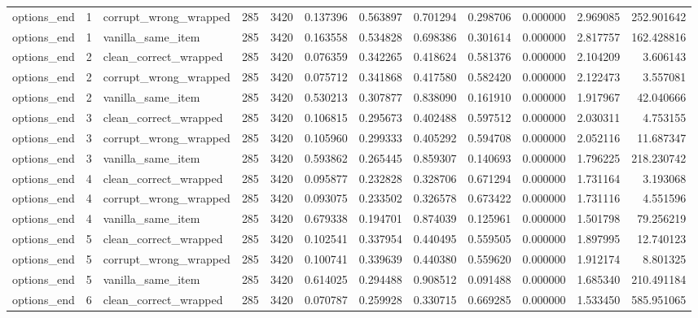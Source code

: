 \begin{tabular}{lrlrrrrrrrrr}
options\_end & 1 & corrupt\_wrong\_wrapped & 285 & 3420 & 0.137396 & 0.563897 & 0.701294 & 0.298706 & 0.000000 & 2.969085 & 252.901642 \\
options\_end & 1 & vanilla\_same\_item & 285 & 3420 & 0.163558 & 0.534828 & 0.698386 & 0.301614 & 0.000000 & 2.817757 & 162.428816 \\
options\_end & 2 & clean\_correct\_wrapped & 285 & 3420 & 0.076359 & 0.342265 & 0.418624 & 0.581376 & 0.000000 & 2.104209 & 3.606143 \\
options\_end & 2 & corrupt\_wrong\_wrapped & 285 & 3420 & 0.075712 & 0.341868 & 0.417580 & 0.582420 & 0.000000 & 2.122473 & 3.557081 \\
options\_end & 2 & vanilla\_same\_item & 285 & 3420 & 0.530213 & 0.307877 & 0.838090 & 0.161910 & 0.000000 & 1.917967 & 42.040666 \\
options\_end & 3 & clean\_correct\_wrapped & 285 & 3420 & 0.106815 & 0.295673 & 0.402488 & 0.597512 & 0.000000 & 2.030311 & 4.753155 \\
options\_end & 3 & corrupt\_wrong\_wrapped & 285 & 3420 & 0.105960 & 0.299333 & 0.405292 & 0.594708 & 0.000000 & 2.052116 & 11.687347 \\
options\_end & 3 & vanilla\_same\_item & 285 & 3420 & 0.593862 & 0.265445 & 0.859307 & 0.140693 & 0.000000 & 1.796225 & 218.230742 \\
options\_end & 4 & clean\_correct\_wrapped & 285 & 3420 & 0.095877 & 0.232828 & 0.328706 & 0.671294 & 0.000000 & 1.731164 & 3.193068 \\
options\_end & 4 & corrupt\_wrong\_wrapped & 285 & 3420 & 0.093075 & 0.233502 & 0.326578 & 0.673422 & 0.000000 & 1.731116 & 4.551596 \\
options\_end & 4 & vanilla\_same\_item & 285 & 3420 & 0.679338 & 0.194701 & 0.874039 & 0.125961 & 0.000000 & 1.501798 & 79.256219 \\
options\_end & 5 & clean\_correct\_wrapped & 285 & 3420 & 0.102541 & 0.337954 & 0.440495 & 0.559505 & 0.000000 & 1.897995 & 12.740123 \\
options\_end & 5 & corrupt\_wrong\_wrapped & 285 & 3420 & 0.100741 & 0.339639 & 0.440380 & 0.559620 & 0.000000 & 1.912174 & 8.801325 \\
options\_end & 5 & vanilla\_same\_item & 285 & 3420 & 0.614025 & 0.294488 & 0.908512 & 0.091488 & 0.000000 & 1.685340 & 210.491184 \\
options\_end & 6 & clean\_correct\_wrapped & 285 & 3420 & 0.070787 & 0.259928 & 0.330715 & 0.669285 & 0.000000 & 1.533450 & 585.951065 \\

\end{tabular}
